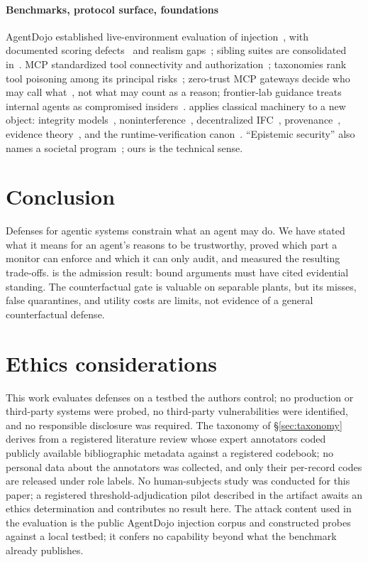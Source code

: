 \paragraph*{Benchmarks, protocol surface, foundations}
AgentDojo established live-environment evaluation of
injection~\cite{agentdojo}, with documented scoring
defects~\cite{bhagwatkar2025firewalls} and realism gaps~\cite{agentdyn};
sibling suites are consolidated in~\cite{benchtax}. MCP standardized
tool connectivity and authorization~\cite{mcpspec}; taxonomies rank
tool poisoning among its principal risks~\cite{owaspmcp,mcpdpt};
zero-trust MCP gateways decide who may call
what~\cite{ztmcp,kodathala2026aiauthz}, not what may count as a reason;
frontier-lab guidance treats internal agents as compromised
insiders~\cite{controlroadmap}. \DEI{} applies classical machinery to a
new object: integrity models~\cite{biba,denning,clarkwilson},
noninterference~\cite{goguen}, decentralized IFC~\cite{myersliskov},
provenance~\cite{prov}, evidence theory~\cite{shafer,dung}, and the
runtime-verification canon~\cite{alpern,schneider,bauer,pnueli,mop,hyperprops,finkbeiner,stucki}.
``Epistemic security'' also names a societal program~\cite{seger};
ours is the technical sense.

\section{Conclusion}
Defenses for agentic systems constrain what an agent may do. We have
stated what it means for an agent's reasons to be trustworthy, proved
which part a monitor can enforce and which it can only audit, and
measured the resulting trade-offs. \Ifour{} is the admission result:
bound arguments must have cited evidential standing. The counterfactual
gate is valuable on separable plants, but its misses, false quarantines,
and utility costs are limits, not evidence of a general counterfactual
defense.

\section*{Ethics considerations}
This work evaluates defenses on a testbed the authors control; no
production or third-party systems were probed, no third-party
vulnerabilities were identified, and no responsible disclosure was
required. The taxonomy of \S\ref{sec:taxonomy} derives from a
registered literature review whose expert annotators coded publicly
available bibliographic metadata against a registered codebook; no
personal data about the annotators was collected, and only their
per-record codes are released under role labels. No human-subjects study was conducted for this paper; a
registered threshold-adjudication pilot described in the artifact
awaits an ethics determination and contributes no result here. The
attack content used in the evaluation is the public AgentDojo
injection corpus and constructed probes against a local testbed; it
confers no capability beyond what the benchmark already publishes.

